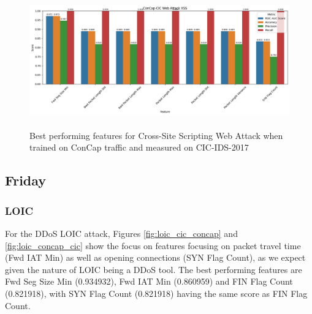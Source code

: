 \begin{figure}
	\centering
	\includegraphics[width=1.2\linewidth]{images/web_xss_concap_cic}
	\caption{\\Best performing features for Cross-Site Scripting Web Attack when trained on ConCap traffic and measured on CIC-IDS-2017}
	\label{fig:web_xss_concap_cic}
\end{figure}

\FloatBarrier

\subsection{Friday}

\subsubsection{LOIC}

For the DDoS LOIC attack, Figures \ref{fig:loic_cic_concap} and \ref{fig:loic_concap_cic} show the focus on features focusing on packet travel time (Fwd IAT Min) as well as opening connections (SYN Flag Count), as we expect given the nature of LOIC being a DDoS tool. The best performing features are Fwd Seg Size Min (0.934932), Fwd IAT Min (0.860959) and FIN Flag Count (0.821918), with SYN Flag Count (0.821918) having the same score as FIN Flag Count.

